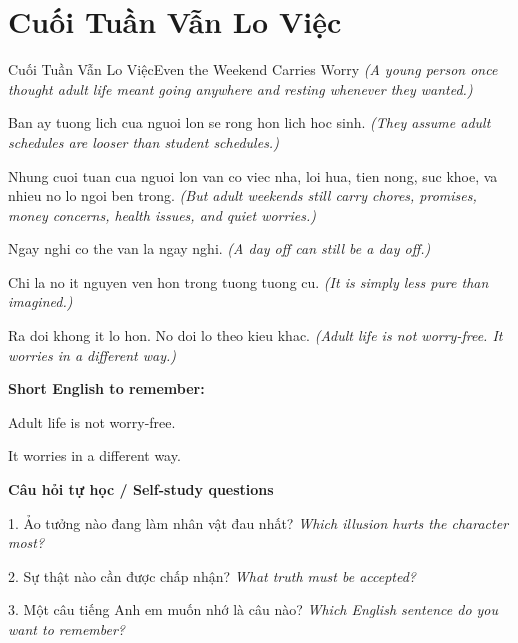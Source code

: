 \section{Cuối Tuần Vẫn Lo Việc}
\begin{truyen}{Cuối Tuần Vẫn Lo Việc}{Even the Weekend Carries Worry}
\textit{(A young person once thought adult life meant going anywhere and resting whenever they wanted.)}

Ban ay tuong lich cua nguoi lon se rong hon lich hoc sinh.
\textit{(They assume adult schedules are looser than student schedules.)}

Nhung cuoi tuan cua nguoi lon van co viec nha, loi hua, tien nong, suc khoe, va nhieu no lo ngoi ben trong.
\textit{(But adult weekends still carry chores, promises, money concerns, health issues, and quiet worries.)}

Ngay nghi co the van la ngay nghi.
\textit{(A day off can still be a day off.)}

Chi la no it nguyen ven hon trong tuong tuong cu.
\textit{(It is simply less pure than imagined.)}

\end{truyen}

\begin{baihoc}
Ra doi khong it lo hon. No doi lo theo kieu khac.
\textit{(Adult life is not worry-free. It worries in a different way.)}
\end{baihoc}

\begin{ghinhoanh}
\textbf{Short English to remember:}

Adult life is not worry-free.

It worries in a different way.

\end{ghinhoanh}

\begin{tuhocnhanh}
\textbf{Câu hỏi tự học / Self-study questions}

1. Ảo tưởng nào đang làm nhân vật đau nhất? \textit{Which illusion hurts the character most?}

2. Sự thật nào cần được chấp nhận? \textit{What truth must be accepted?}

3. Một câu tiếng Anh em muốn nhớ là câu nào? \textit{Which English sentence do you want to remember?}
\end{tuhocnhanh}
\ngancach

